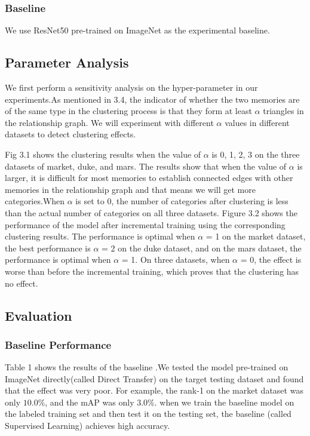 \documentclass{article}
\begin{document}
\subsubsection{Baseline}
We use ResNet50 pre-trained on ImageNet as the experimental baseline.

\subsection{Parameter Analysis}
We first perform a sensitivity analysis on the hyper-parameter in our experiments.As mentioned in 3.4, the indicator of whether the two memories are of the same type in the clustering process is that they form at least $\alpha$ triangles in the relationship graph. We will experiment with different $\alpha$ values in different datasets to detect clustering effects.

Fig 3.1 shows the clustering results when the value of $\alpha$ is 0, 1, 2, 3 on the three datasets of market, duke, and mars. The results show that when the value of $\alpha$ is larger, it is difficult for most memories to establish connected edges with other memories in the relationship graph and that means we will get more categories.When $\alpha$ is set to 0, the number of categories after clustering is less than the actual number of categories on all three datasets. Figure 3.2 shows the performance of the model after incremental training using the corresponding clustering results. The performance is optimal when $\alpha$ = 1 on the market dataset, the best performance is $\alpha$ = 2 on the duke dataset, and on the mars dataset, the performance is optimal when $\alpha$ = 1. On three datasets, when $\alpha$ = 0, the effect is worse than before the incremental training, which proves that the clustering has no effect.


\subsection{Evaluation}

\subsubsection{Baseline Performance}
Table 1 shows the results of the baseline .We tested the model pre-trained on ImageNet directly(called Direct Transfer) on the target testing dataset and found that the effect was very poor. For example, the rank-1 on the market dataset was only $10.0\%$, and the mAP was only $3.0\%$. when we train the baseline model on the labeled training set and then test it on the testing set,  the baseline (called Supervised Learning) achieves high accuracy.
\end{document}
